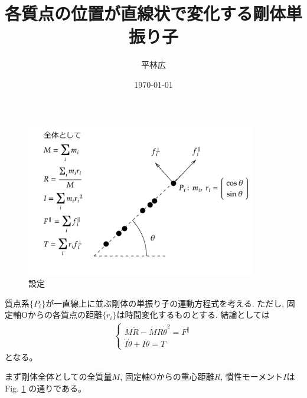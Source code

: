 \documentclass[a4paper,11pt]{jsarticle}
\begin{document}
\title{各質点の位置が直線状で変化する剛体単振り子}
\author{平林広}
\date{\today}
\maketitle

\begin{figure}[h]
  \centering
  \includegraphics[width = 0.9\textwidth]{config.png}
  \caption{設定}
  \label{config.png}
\end{figure}

質点系$\{P_i\}$が一直線上に並ぶ剛体の単振り子の運動方程式を考える. 
ただし, 固定軸$\mathrm{O}$からの各質点の距離$\{r_i\}$は時間変化するものとする. 
結論としては
\begin{align*}
  \begin{cases}
  M \ddot{R} - M R \dot{\theta}^2 = F^\parallel
  \\
  \dot{I} \dot{\theta} + I \ddot{\theta} = T
  \end{cases}
\end{align*}
となる。

まず剛体全体としての全質量$M$, 
固定軸$\mathrm{O}$からの重心距離$R$, 
慣性モーメント$I$は
Fig. \ref{config.png}
の通りである。
\end{document}
